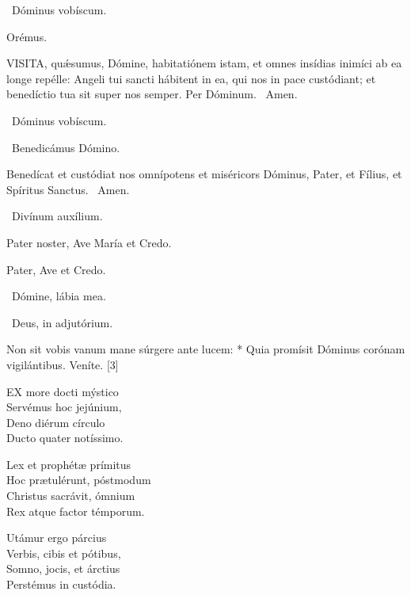 \sectionornament

\V\ Dóminus vobíscum.

Orémus. 

\lettrine[lines=2]{V}{ISITA}, quǽsumus, Dómine, habitatiónem istam, et omnes insídias inimíci ab ea longe repélle: Angeli tui sancti hábitent in ea, qui nos in pace custódiant; et benedíctio tua sit super nos semper. Per Dóminum. \R\ Amen.

\V\ Dóminus vobíscum.

\V\ Benedicámus Dómino.

 Benedícat et custódiat nos omnípotens et miséricors Dóminus, Pater, et Fílius, et Spíritus Sanctus. \R\ Amen.


\V\ Divínum auxílium.

Pater noster, Ave María et Credo.

\sectionornament



Pater, Ave et Credo.

\V\ Dómine, lábia mea.

\V\ Deus, in adjutórium.



 Non sit vobis vanum mane súrgere ante lucem: * Quia promísit Dóminus corónam vigilántibus.  Veníte. [3]


\lettrine[lines=2]{E}{X} more docti mýstico\\
Servémus hoc jejúnium,\\
Deno diérum círculo\\
Ducto quater notíssimo.

Lex et prophétæ prímitus\\
Hoc prætulérunt, póstmodum\\
Christus sacrávit, ómnium\\
Rex atque factor témporum.

Utámur ergo párcius\\
Verbis, cibis et pótibus,\\
Somno, jocis, et árctius\\
Perstémus in custódia.

